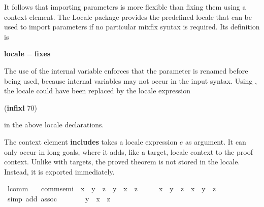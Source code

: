 \begin{isabellebody}
\begin{isamarkuptext}
  It follows that importing
  parameters is more flexible than fixing them using a context element.
  The Locale package provides the predefined locale  that
  can be used to import parameters if no
  particular mixfix syntax is required.
  Its definition is
\begin{center}
  \textbf{locale}  = \textbf{fixes} 
\end{center}
  The use of the internal variable 
  enforces that the parameter is renamed before being used, because
  internal variables may not occur in the input syntax.  Using
  , the locale  could have been replaced by
  the locale expression
\begin{center}
    (\textbf{infixl} \isa{{\isachardoublequote}{\isasymcdot}{\isachardoublequote}} 70)
\end{center}
  in the above locale declarations.%
\end{isamarkuptext}%
\isamarkuptrue%
%
\isamarkuptrue%
%
\begin{isamarkuptext}%
\label{sec-includes}
  The context element \textbf{includes} takes a locale expression $e$
  as argument.  It can only occur in long goals, where it
  adds, like a target, locale context to the proof context.  Unlike
  with targets, the proved theorem is not stored
  in the locale.  Instead, it is exported immediately.%
\end{isamarkuptext}%
\isamarkupfalse%
\ lcomm{}{\isacharcolon}\isanewline
\ \ \ comm{\isacharunderscore}semi\ \ {\isachardoublequote}x\ {\isasymcdot}\ {\isacharparenleft}y\ {\isasymcdot}\ z{\isacharparenright}\ {\isacharequal}\ y\ {\isasymcdot}\ {\isacharparenleft}x\ {\isasymcdot}\ z{\isacharparenright}{\isachardoublequote}\isanewline
%
\isadelimproof
%
\endisadelimproof
%
\isatagproof
\isamarkupfalse%
\ {\isacharminus}\isanewline
\ \ \isamarkupfalse%
\ {\isachardoublequote}x\ {\isasymcdot}\ {\isacharparenleft}y\ {\isasymcdot}\ z{\isacharparenright}\ {\isacharequal}\ {\isacharparenleft}x\ {\isasymcdot}\ y{\isacharparenright}\ {\isasymcdot}\ z{\isachardoublequote}\ \isamarkupfalse%
\ {\isacharparenleft}simp\ add{\isacharcolon}\ assoc{\isacharparenright}\isanewline
\ \ \isamarkupfalse%
\ \isamarkupfalse%
\ {\isachardoublequote}{\isasymdots}\ {\isacharequal}\ {\isacharparenleft}y\ {\isasymcdot}\ x{\isacharparenright}\ {\isasymcdot}\ z{\isachardoublequote}\ \isamarkupfalse%

\end{isabellebody}
